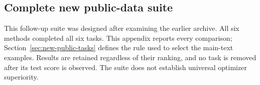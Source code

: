 \subsection{Complete new public-data suite}
\label{app:new-task-full}
This follow-up suite was designed after examining the earlier archive.
All six methods completed all six tasks. This appendix reports every
comparison; Section~\ref{sec:new-public-tasks} defines the rule used to
select the main-text examples. Results are retained regardless of their
ranking, and no task is removed after its test score is observed. The suite
does not establish universal optimizer superiority.

\begin{table}[htbp]\centering\small
\caption{Prepared data splits and primary metrics for the six new tasks.
Preprocessing is fitted on the training split only. Counts refer to examples
after preparation, not nominal dataset sizes.}
\end{table}


